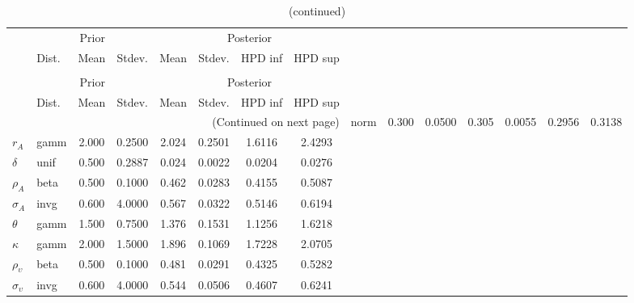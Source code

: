  
\begin{center}
\begin{longtable}{llcccccc} 
\caption{Results from Metropolis-Hastings (parameters)}
 \label{Table:MHPosterior:1}\\
\toprule 
  & \multicolumn{3}{c}{Prior}  &  \multicolumn{4}{c}{Posterior} \\
  \cmidrule(r{.75em}){2-4} \cmidrule(r{.75em}){5-8}
  & Dist. & Mean  & Stdev. & Mean & Stdev. & HPD inf & HPD sup\\
\midrule \endfirsthead 
\caption{(continued)}\\\toprule 
  & \multicolumn{3}{c}{Prior}  &  \multicolumn{4}{c}{Posterior} \\
  \cmidrule(r{.75em}){2-4} \cmidrule(r{.75em}){5-8}
  & Dist. & Mean  & Stdev. & Mean & Stdev. & HPD inf & HPD sup\\
\midrule \endhead 
\bottomrule \multicolumn{8}{r}{(Continued on next page)} \endfoot 
\bottomrule \endlastfoot 
${\alpha}$ & norm &   0.300 & 0.0500 &   0.305& 0.0055 &  0.2956 &  0.3138 \\ 
${r_{A}}$ & gamm &   2.000 & 0.2500 &   2.024& 0.2501 &  1.6116 &  2.4293 \\ 
${\delta}$ & unif &   0.500 & 0.2887 &   0.024& 0.0022 &  0.0204 &  0.0276 \\ 
${\rho_A}$ & beta &   0.500 & 0.1000 &   0.462& 0.0283 &  0.4155 &  0.5087 \\ 
${\sigma_A}$ & invg &   0.600 & 4.0000 &   0.567& 0.0322 &  0.5146 &  0.6194 \\ 
${\theta}$ & gamm &   1.500 & 0.7500 &   1.376& 0.1531 &  1.1256 &  1.6218 \\ 
${\kappa}$ & gamm &   2.000 & 1.5000 &   1.896& 0.1069 &  1.7228 &  2.0705 \\ 
${\rho_\upsilon}$ & beta &   0.500 & 0.1000 &   0.481& 0.0291 &  0.4325 &  0.5282 \\ 
${\sigma_\upsilon}$ & invg &   0.600 & 4.0000 &   0.544& 0.0506 &  0.4607 &  0.6241 \\ 
\end{longtable}
 \end{center}
